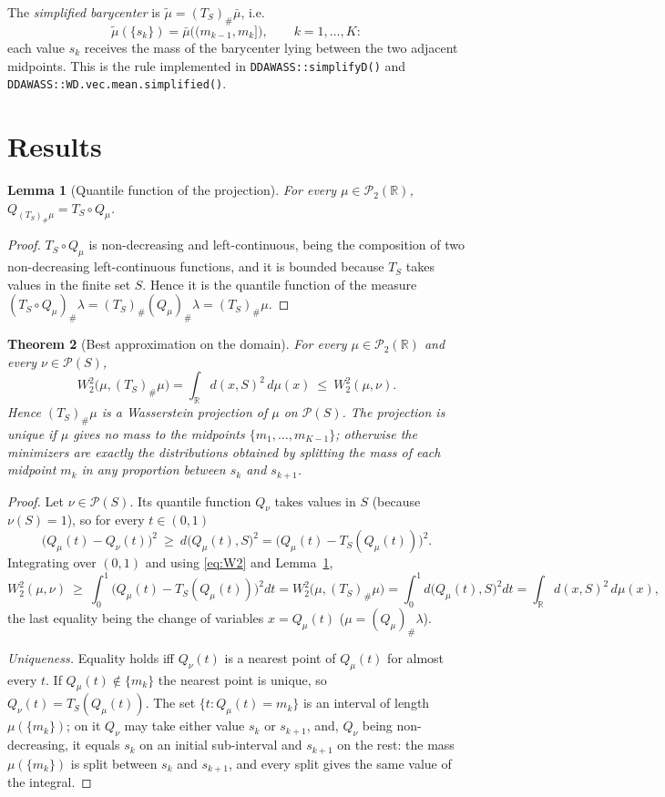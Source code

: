 \documentclass[11pt,a4paper]{article}
\newtheorem{theorem}{Theorem}
\newtheorem{lemma}[theorem]{Lemma}
\theoremstyle{definition}
\newcommand{\R}{\mathbb{R}}
\newcommand{\PS}{\mathcal{P}(S)}
\begin{document}
The \emph{simplified barycenter} is $\tilde\mu=(T_S)_{\#}\bar\mu$, i.e.
\[
  \tilde\mu(\{s_k\})=\bar\mu\big((m_{k-1},m_k]\big),\qquad k=1,\dots,K:
\]
each value $s_k$ receives the mass of the barycenter lying between the two
adjacent midpoints. This is the rule implemented in
\texttt{DDAWASS::simplifyD()} and \texttt{DDAWASS::WD.vec.mean.simplified()}.

\section{Results}

\begin{lemma}[Quantile function of the projection]\label{lem:quantile}
For every $\mu\in\mathcal{P}_2(\R)$,
$Q_{(T_S)_{\#}\mu}=T_S\circ Q_\mu$.
\end{lemma}

\begin{proof}
$T_S\circ Q_\mu$ is non-decreasing and left-continuous, being the composition
of two non-decreasing left-continuous functions, and it is bounded because
$T_S$ takes values in the finite set $S$. Hence it is the quantile function
of the measure $(T_S\circ Q_\mu)_{\#}\lambda=(T_S)_{\#}(Q_\mu)_{\#}\lambda=(T_S)_{\#}\mu$.
\end{proof}

\begin{theorem}[Best approximation on the domain]\label{thm:projection}
For every $\mu\in\mathcal{P}_2(\R)$ and every $\nu\in\PS$,
\[
  W_2^2\big(\mu,(T_S)_{\#}\mu\big)=\int_\R d(x,S)^2\,d\mu(x)\ \le\ W_2^2(\mu,\nu).
\]
Hence $(T_S)_{\#}\mu$ is a Wasserstein projection of $\mu$ on $\PS$. The
projection is unique if $\mu$ gives no mass to the midpoints
$\{m_1,\dots,m_{K-1}\}$; otherwise the minimizers are exactly the distributions
obtained by splitting the mass of each midpoint $m_k$ in any proportion between
$s_k$ and $s_{k+1}$.
\end{theorem}

\begin{proof}
Let $\nu\in\PS$. Its quantile function $Q_\nu$ takes values in $S$ (because
$\nu(S)=1$), so for every $t\in(0,1)$
\[
  \big(Q_\mu(t)-Q_\nu(t)\big)^2\ \ge\ d\big(Q_\mu(t),S\big)^2
  =\big(Q_\mu(t)-T_S(Q_\mu(t))\big)^2 .
\]
Integrating over $(0,1)$ and using \eqref{eq:W2} and Lemma~\ref{lem:quantile},
\[
  W_2^2(\mu,\nu)\ \ge\ \int_0^1\big(Q_\mu(t)-T_S(Q_\mu(t))\big)^2dt
  = W_2^2\big(\mu,(T_S)_{\#}\mu\big)
  =\int_0^1 d\big(Q_\mu(t),S\big)^2dt=\int_\R d(x,S)^2\,d\mu(x),
\]
the last equality being the change of variables $x=Q_\mu(t)$
($\mu=(Q_\mu)_{\#}\lambda$).

\emph{Uniqueness.} Equality holds iff $Q_\nu(t)$ is a nearest point of
$Q_\mu(t)$ for almost every $t$. If $Q_\mu(t)\notin\{m_k\}$ the nearest point
is unique, so $Q_\nu(t)=T_S(Q_\mu(t))$. The set
$\{t: Q_\mu(t)=m_k\}$ is an interval of length $\mu(\{m_k\})$; on it $Q_\nu$ may
take either value $s_k$ or $s_{k+1}$, and, $Q_\nu$ being non-decreasing, it
equals $s_k$ on an initial sub-interval and $s_{k+1}$ on the rest: the mass
$\mu(\{m_k\})$ is split between $s_k$ and $s_{k+1}$, and every split gives the
same value of the integral.
\end{proof}
\end{document}
